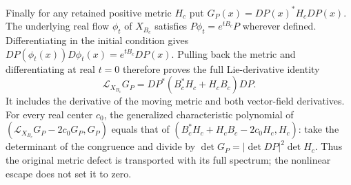 \documentclass[11pt]{article}
\begin{document}
Finally for any retained positive metric $H_c$ put
$G_P(x)=DP(x)^*H_cDP(x)$. The underlying real flow $\phi_t$
of $X_{B_c}$ satisfies $P\phi_t=e^{tB_c}P$ wherever defined.
Differentiating in the initial condition gives
$DP(\phi_t(x))D\phi_t(x)=e^{tB_c}DP(x)$.
Pulling back the metric and differentiating at real $t=0$
therefore proves the full Lie-derivative identity
\[
 \mathcal L_{X_{B_c}}G_P
     =DP^*(B_c^*H_c+H_cB_c)DP. \tag{CA15}
\]
It includes the derivative of the moving metric and both
vector-field derivatives. For every real center $c_0$, the
generalized characteristic polynomial of
$(\mathcal L_{X_{B_c}}G_P-2c_0G_P,G_P)$ equals that of
$(B_c^*H_c+H_cB_c-2c_0H_c,H_c)$: take the determinant of
the congruence and divide by $\det G_P=|\det DP|^2\det H_c$.
Thus the original metric defect is transported with its full
spectrum; the nonlinear escape does not set it to zero.
\end{document}
